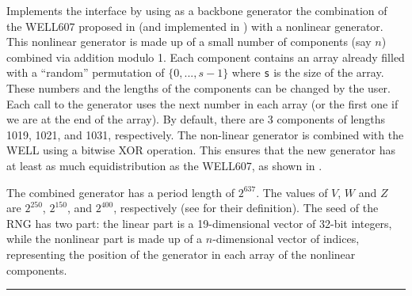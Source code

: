 
Implements the  interface by using as a backbone
generator the combination of the WELL607 proposed in \cite{rPAN04t,rPAN06b}
(and implemented in ) with a nonlinear generator.
This nonlinear generator is made up of a small number of components (say $n$)
combined via addition modulo 1. Each component contains an array already
filled with a ``random'' permutation of $\{0,...,s-1\}$ where \texttt{s} is the
size of the array.
These numbers and the lengths of the components can be changed by the user.
Each call to the generator uses the next number in each array
(or the first one if we are at the end of the array). By default,
there are 3 components of lengths 1019, 1021, and 1031, respectively.
The non-linear generator is combined with the WELL using a bitwise XOR operation.
This ensures that the new generator has at least as much equidistribution
as the WELL607, as shown in \cite{rLEC03c}.

The combined generator has a period length of 
\latex{$\rho\approx$ } $2^{637}$. The values of $V$, $W$ and $Z$
 are $2^{250}$,
$2^{150}$, and $2^{400}$, respectively (see  for their
definition). The seed of the RNG has two part: the linear part is a
19-dimensional vector of 32-bit integers, while the nonlinear part is
made up of a $n$-dimensional vector of indices, representing the position
of the generator in each array of the nonlinear components.


\bigskip\hrule

